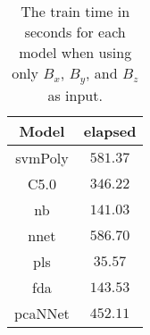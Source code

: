 \begin{table}[!ht]
	\centering
	\begin{tabular}{|c|c|}
		\hline
		Model & elapsed \\ \hline
		svmPoly & $581.37$ \\ \hline
		C5.0 & $346.22$ \\ \hline
		nb & $141.03$ \\ \hline
		nnet & $586.70$ \\ \hline
		pls & $35.57$ \\ \hline
		fda & $143.53$ \\ \hline
		pcaNNet & $452.11$ \\ \hline
	\end{tabular}
	\caption{The train time in seconds for each model when using only $B_{x}$, $B_{y}$, and $B_{z}$ as input.}
	\label{tab:time:coord:train}
\end{table}
